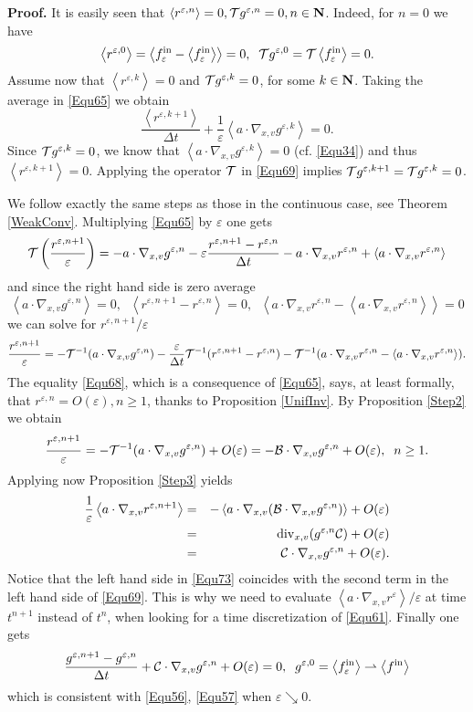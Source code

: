 \documentclass[12pt, a4paper]{article}
\newcommand{\red}{\textcolor{red!95!black}}
\providecommand\mathbb{\bf}
\newcommand\N{{\mathbb N}}
\newcounter{steps}
\newenvironment{proof}[1][]{%
\par\medbreak\setcounter{steps}{0}
{\noindent\bfseries Proof#1. }} {\hfill\fbox{\ }\medbreak}
\newcommand{\eps}[0]{
\varepsilon}
\newcommand{\re}[0]{
r ^\varepsilon}
\newcommand{\rez}[0]{
r ^{\varepsilon, 0}}
\newcommand{\ren}[0]{
r ^{\varepsilon, n}}
\newcommand{\renpo}[0]{
r ^{\varepsilon, n + 1}}
\newcommand{\gez}[0]{
g ^{\varepsilon, 0}}
\newcommand{\gen}[0]{
g ^{\varepsilon, n}}
\newcommand{\genpo}[0]{
g ^{\varepsilon, n + 1}}
\newcommand{\fin}[0]{
f ^{\mathrm{in}}}
\newcommand{\fine}[0]{
f ^{\mathrm{in}}_{\varepsilon}}
\newcommand{\Divxv}[0]{
\mathrm{div}_{x,v}}
\newcommand{\nxv}[0]{
\nabla_{x,v}}
\newcommand{\ave}[1]{
\left \langle #1 \right \rangle }
\begin{document}
\begin{proof}
It is easily seen that $\ave{\ren} = 0, {\cal T} \gen = 0, n \in \N$. Indeed, for $n = 0$ we have
\[
\ave{\rez} = \ave{\fine - \ave{\fine}} = 0,\;\;{\cal T} \gez = {\cal T} \ave{\fine} = 0.
\]
Assume now that $\ave{r ^{\eps, k}} = 0$ and ${\cal T}g ^{\eps, k} = 0$, for some $ k \in \N$. Taking the average in \eqref{Equ65} we obtain
\[
\frac{\ave{r ^{\eps, k+1}}}{\Delta t} + \frac{1}{\eps} \ave{a \cdot \nxv g ^{\eps, k}} = 0.
\]
Since ${\cal T} g ^{\eps, k} = 0$, we know that $\ave{a \cdot \nxv g ^{\eps, k}} = 0$ (cf. \eqref{Equ34}) and thus $\ave{r ^{\eps, k+1}} = 0$. Applying the operator ${\cal T} $ in \eqref{Equ69} implies ${\cal T} g ^{\eps, k+1} = {\cal T} g ^{\eps, k} = 0$. 

We follow exactly the same steps as those in the continuous case, see Theorem \ref{WeakConv}. Multiplying \eqref{Equ65} by $\eps$ one gets
\[
{\cal T} \left ( \frac{\renpo}{\eps} \right ) = - a \cdot \nxv \gen - \eps \frac{\renpo - \ren}{\Delta t} - a\cdot \nxv \ren + \ave{a \cdot \nxv \ren}
\]
and since the right hand side is zero average
\[
\ave{ a \cdot \nxv \gen } = 0,\;\;\ave{ \renpo - \ren } = 0,\;\;\ave{a \cdot \nxv \ren - \ave{a \cdot \nxv \ren }} = 0
\]
we can solve for $\renpo / \eps$
\[
\frac{\renpo}{\eps} = - {\cal T} ^{-1} ( a \cdot \nxv \gen ) - \frac{\eps}{\Delta t } {\cal T} ^{-1} ( \renpo - \ren ) - {\cal T} ^ {-1} ( a \cdot \nxv \ren - \ave{a \cdot \nxv \ren } ).
\]
\red{The equality \eqref{Equ68}, which is a consequence of \eqref{Equ65}, says, at least formally, that $\ren = O(\eps), n \geq 1$, thanks to Proposition \ref{UnifInv}. By Proposition \ref{Step2} we obtain
\[
\frac{\renpo}{\eps} = - {\cal T} ^ {-1} ( a \cdot \nxv \gen ) + O (\eps) = - {\cal B} \cdot \nxv \gen + O(\eps),\;\;n \geq 1.
\]
}
Applying now Proposition \ref{Step3} yields
\begin{eqnarray}
\label{Equ73} \frac{1}{\eps} \ave{a \cdot \nxv \renpo} & = & - \ave{a \cdot \nxv ( {\cal B} \cdot \nxv \gen )} + O (\eps) \nonumber \\
& = & \Divxv(\gen {\cal C}) + O (\eps) \nonumber \\
& = & {\cal C} \cdot \nxv \gen + O (\eps).
\end{eqnarray}
Notice that the left hand side in \eqref{Equ73} coincides with the second term in the left hand side of \eqref{Equ69}. This is why we need to evaluate $\ave{a \cdot \nxv \re} /\eps $ at time $t^{n+1}$ instead of $t^n$, when looking for a time discretization of \eqref{Equ61}. Finally one gets
\[
\frac{\genpo - \gen}{\Delta t} + {\cal C} \cdot \nxv \gen + O(\eps) = 0,\;\;\gez = \ave{\fine} \rightharpoonup \ave{\fin}
\]
which is consistent with \eqref{Equ56}, \eqref{Equ57} when $\eps \searrow 0$. 
\end{proof}
\end{document}
